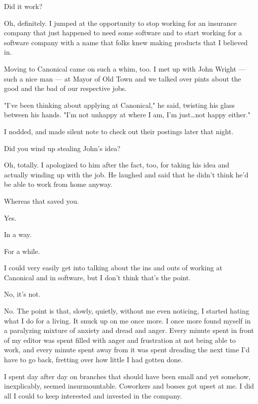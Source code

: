 \begin{ally}
Did it work?
\end{ally}
Oh, definitely. I jumped at the opportunity to stop working for an insurance company that just happened to need some software and to start working for a software company with a name that folks knew making products that I believed in.

Moving to Canonical came on such a whim, too. I met up with John Wright --- such a nice man --- at Mayor of Old Town and we talked over pints about the good and the bad of our respective jobs.

"I've been thinking about applying at Canonical," he said, twisting his glass between his hands. "I'm not unhappy at where I am, I'm just\ldots{}not happy either."

I nodded, and made silent note to check out their postings later that night.

\begin{ally}
Did you wind up stealing John's idea?
\end{ally}
Oh, totally. I apologized to him after the fact, too, for taking his idea and actually winding up with the job. He laughed and said that he didn't think he'd be able to work from home anyway.

\begin{ally}
Whereas that saved you.
\end{ally}
Yes.

In a way.

For a while.

\newpage

\noindent I could very easily get into talking about the ins and outs of working at Canonical and in software, but I don't think that's the point.

\begin{ally}
No, it's not.
\end{ally}
No. The point is that, slowly, quietly, without me even noticing, I started hating what I do for a living. It snuck up on me once more. I once more found myself in a paralyzing mixture of anxiety and dread and anger. Every minute spent in front of my editor was spent filled with anger and frustration at not being able to work, and every minute spent away from it was spent dreading the next time I'd have to go back, fretting over how little I had gotten done.

I spent day after day on branches that should have been small and yet somehow, inexplicably, seemed insurmountable. Coworkers and bosses got upset at me. I did all I could to keep interested and invested in the company.

